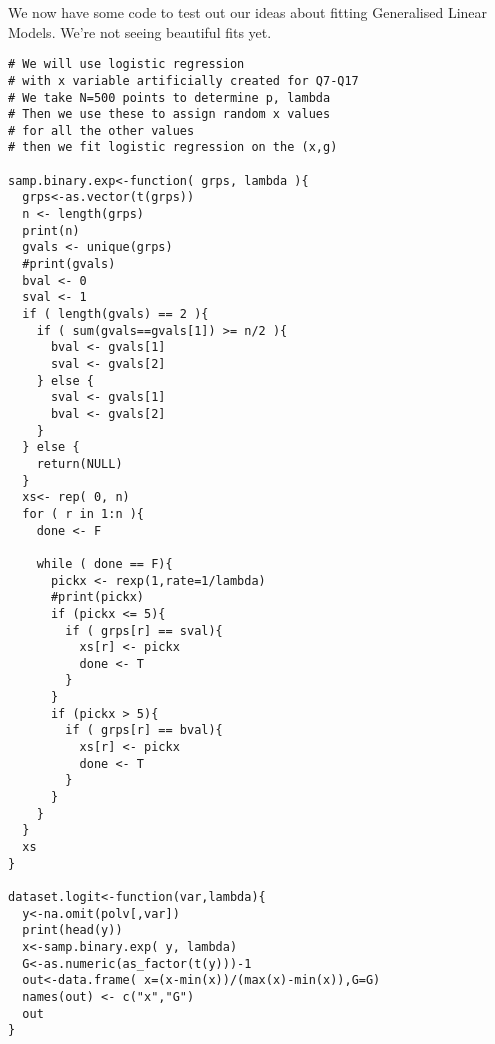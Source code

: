 \documentclass{amsart}
\begin{document}
We now have some code to test out our ideas about fitting Generalised Linear Models.  We're not seeing beautiful fits yet.

\begin{verbatim}
# We will use logistic regression
# with x variable artificially created for Q7-Q17
# We take N=500 points to determine p, lambda
# Then we use these to assign random x values
# for all the other values
# then we fit logistic regression on the (x,g)

samp.binary.exp<-function( grps, lambda ){
  grps<-as.vector(t(grps))
  n <- length(grps)
  print(n)
  gvals <- unique(grps)
  #print(gvals)
  bval <- 0
  sval <- 1
  if ( length(gvals) == 2 ){
    if ( sum(gvals==gvals[1]) >= n/2 ){
      bval <- gvals[1]
      sval <- gvals[2]
    } else {
      sval <- gvals[1]
      bval <- gvals[2]
    }
  } else {
    return(NULL)
  }
  xs<- rep( 0, n)
  for ( r in 1:n ){
    done <- F
    
    while ( done == F){
      pickx <- rexp(1,rate=1/lambda)
      #print(pickx)
      if (pickx <= 5){
        if ( grps[r] == sval){
          xs[r] <- pickx
          done <- T
        }  
      }
      if (pickx > 5){
        if ( grps[r] == bval){
          xs[r] <- pickx
          done <- T
        }  
      }
    }
  }
  xs
}

dataset.logit<-function(var,lambda){
  y<-na.omit(polv[,var])
  print(head(y))
  x<-samp.binary.exp( y, lambda)
  G<-as.numeric(as_factor(t(y)))-1
  out<-data.frame( x=(x-min(x))/(max(x)-min(x)),G=G)
  names(out) <- c("x","G")
  out
}

\end{verbatim}
\end{document}
